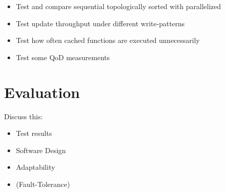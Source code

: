 \begin{itemize}
  \item Test and compare sequential topologically sorted with parallelized
  \item Test update throughput under different write-patterns
  \item Test how often cached functions are executed unnecessarily
  \item Test some QoD measurements
\end{itemize}



\section{Evaluation}
\label{sec:evaluation}

Discuss this:

\begin{itemize}
  \item Test results
  \item Software Design
  \item Adaptability
  \item (Fault-Tolerance)
\end{itemize}





